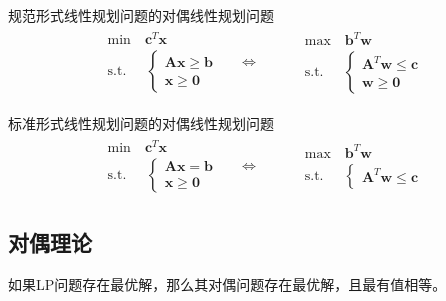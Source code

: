 \documentclass[lang = cn, scheme = chinese, thmcnt = section]{elegantbook}
\newcommand{\bs}{\boldsymbol}          %
\begin{document}
\begin{definition}{规范形式线性规划问题的对偶线性规划问题}
	\begin{align*}
		\begin{aligned}
			& \text{min}  \quad \bs{c}^T\bs{x}\\
			& \text{s.t.} \;\, \quad \begin{cases}
				\bs{A} \bs{x} \ge \bs{b}\\
				\bs{x} \ge \bs{0}
			\end{cases}
		\end{aligned}
		\quad\iff\qquad
		\begin{aligned}
			& \text{max}  \quad \bs{b}^T\bs{w}\\
			& \text{s.t.} \;\, \quad \begin{cases}
				\bs{A}^T \bs{w} \le \bs{c}\\
				\bs{w} \ge \bs{0}
			\end{cases}
		\end{aligned}
	\end{align*}
\end{definition}

\begin{definition}{标准形式线性规划问题的对偶线性规划问题}
	\begin{align*}
		\begin{aligned}
			& \text{min}  \quad \bs{c}^T\bs{x}\\
			& \text{s.t.} \;\, \quad \begin{cases}
				\bs{A} \bs{x} = \bs{b}\\
				\bs{x} \ge \bs{0}
			\end{cases}
		\end{aligned}
		\quad\iff\qquad
		\begin{aligned}
			& \text{max}  \quad \bs{b}^T\bs{w}\\
			& \text{s.t.} \;\, \quad \begin{cases}
				\bs{A}^T \bs{w} \le \bs{c}
			\end{cases}
		\end{aligned}
	\end{align*}
\end{definition}

\subsection{对偶理论}

\begin{theorem}
	如果LP问题存在最优解，那么其对偶问题存在最优解，且最有值相等。
\end{theorem}
\end{document}
